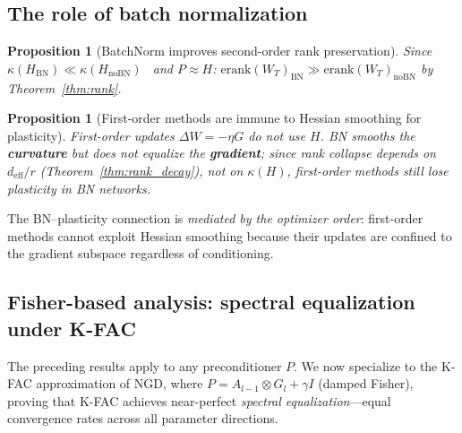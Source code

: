 \documentclass{article}
\newtheorem{proposition}[theorem]{Proposition}
\newtheorem{remark}{Remark}
\newcommand{\erank}{\mathrm{erank}}
\begin{document}

\subsection{The role of batch normalization}

\begin{proposition}[BatchNorm improves second-order rank preservation]
\label{prop:bn_secondorder}
Since $\kappa(H_{\mathrm{BN}}) \ll \kappa(H_{\mathrm{noBN}})$~\citep{ghorbani2019investigation} and $P \approx H$: $\erank(W_T)_{\mathrm{BN}} \gg \erank(W_T)_{\mathrm{noBN}}$ by Theorem~\ref{thm:rank}.
\end{proposition}

\begin{proposition}[First-order methods are immune to Hessian smoothing for plasticity]
\label{prop:first_order_immune}
First-order updates $\Delta W = -\eta G$ do not use $H$. BN smooths the \textbf{curvature} but does not equalize the \textbf{gradient}; since rank collapse depends on $d_{\mathrm{eff}}/r$ (Theorem~\ref{thm:rank_decay}), not on $\kappa(H)$, first-order methods still lose plasticity in BN networks.
\end{proposition}

The BN--plasticity connection is \emph{mediated by the optimizer order}: first-order methods cannot exploit Hessian smoothing because their updates are confined to the gradient subspace regardless of conditioning.

\subsection{Fisher-based analysis: spectral equalization under K-FAC}
\label{sec:spectral}

The preceding results apply to any preconditioner $P$. We now specialize to the K-FAC approximation of NGD, where $P = A_{l-1} \otimes G_l + \gamma I$ (damped Fisher), proving that K-FAC achieves near-perfect \emph{spectral equalization}---equal convergence rates across all parameter directions.
\end{document}
